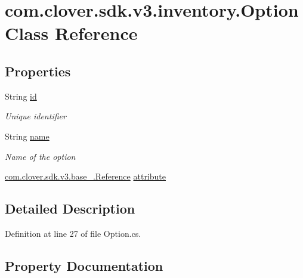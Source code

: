 \hypertarget{classcom_1_1clover_1_1sdk_1_1v3_1_1inventory_1_1_option}{}\section{com.\+clover.\+sdk.\+v3.\+inventory.\+Option Class Reference}
\label{classcom_1_1clover_1_1sdk_1_1v3_1_1inventory_1_1_option}
\subsection*{Properties}
\begin{DoxyCompactItemize}
\item 
String \hyperlink{classcom_1_1clover_1_1sdk_1_1v3_1_1inventory_1_1_option_a1935df102ba458e526af39bbaedd0f84}{id}
\begin{DoxyCompactList}\small\item\em Unique identifier \end{DoxyCompactList}\item 
String \hyperlink{classcom_1_1clover_1_1sdk_1_1v3_1_1inventory_1_1_option_a1e65b5dc17e96ddce0588e7908eb6e45}{name}
\begin{DoxyCompactList}\small\item\em Name of the option \end{DoxyCompactList}\item 
\hyperlink{classcom_1_1clover_1_1sdk_1_1v3_1_1base___1_1_reference}{com.\+clover.\+sdk.\+v3.\+base\+\_\+.\+Reference} \hyperlink{classcom_1_1clover_1_1sdk_1_1v3_1_1inventory_1_1_option_acee34514e4f81cdc8320dde8262a5224}{attribute}
\end{DoxyCompactItemize}


\subsection{Detailed Description}


Definition at line 27 of file Option.\+cs.



\subsection{Property Documentation}
\mbox{\label{classcom_1_1clover_1_1sdk_1_1v3_1_1inventory_1_1_option_acee34514e4f81cdc8320dde8262a5224}} 
